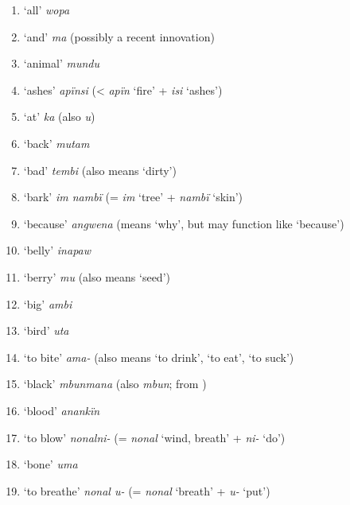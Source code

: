 \begin{enumerate}[noitemsep, label={\arabic*}, align=left, widest=190, labelsep=1ex,leftmargin=*]
\item ‘all’ \textit{wopa}

\item ‘and’ \textit{ma} (possibly a recent innovation)

\item ‘animal’ \textit{mundu}

\item ‘ashes’ \textit{apïnsi} (< \textit{apïn} ‘fire’ + \textit{isi} ‘ashes’)

\item ‘at’ \textit{ka} (also \textit{u})

\item ‘back’ \textit{mutam}

\item ‘bad’ \textit{tembi} (also means ‘dirty’)

\item ‘bark’ \textit{im nambï} (= \textit{im} ‘tree’ + \textit{nambï} ‘skin’)

\item ‘because’ \textit{angwena} (means ‘why’, but may function like ‘because’)

\item ‘belly’ \textit{inapaw}

\item ‘berry’ \textit{mu} (also means ‘seed’)

\item ‘big’ \textit{ambi}

\item ‘bird’ \textit{uta}

\item ‘to bite’ \textit{ama-} (also means ‘to drink’, ‘to eat’, ‘to suck’)

\item ‘black’ \textit{mbunmana} (also \textit{mbun};  from )

\item ‘blood’ \textit{anankïn}

\item ‘to blow’ \textit{nonalni-} (= \textit{nonal} ‘wind, breath’ + \textit{ni{}-} ‘do’)

\item ‘bone’ \textit{uma}

\item ‘to breathe’ \textit{nonal u-} (= \textit{nonal} ‘breath’ + \textit{u-} ‘put’)


\end{enumerate}
